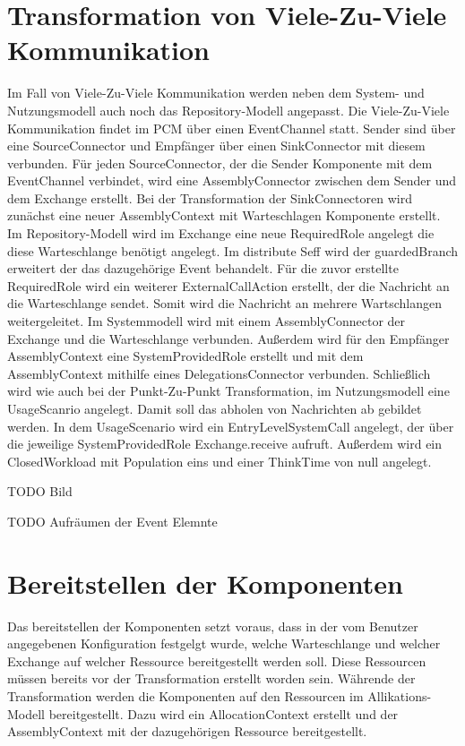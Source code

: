 \section{Transformation von Viele-Zu-Viele Kommunikation}
Im Fall von Viele-Zu-Viele Kommunikation werden neben dem System- und Nutzungsmodell auch noch das Repository-Modell angepasst. Die Viele-Zu-Viele Kommunikation findet im PCM über einen EventChannel statt. Sender sind über eine SourceConnector und Empfänger über einen SinkConnector mit diesem verbunden. Für jeden SourceConnector, der die Sender Komponente mit dem EventChannel verbindet, wird eine AssemblyConnector zwischen dem Sender und dem Exchange erstellt. Bei der Transformation der SinkConnectoren wird zunächst eine neuer AssemblyContext mit Warteschlagen Komponente erstellt. Im Repository-Modell wird im Exchange eine neue RequiredRole angelegt die diese Warteschlange benötigt angelegt. Im distribute Seff wird der guardedBranch erweitert der das dazugehörige Event behandelt. Für die zuvor erstellte RequiredRole wird ein weiterer ExternalCallAction erstellt, der die Nachricht an die Warteschlange sendet. Somit wird die Nachricht an mehrere Wartschlangen weitergeleitet. Im Systemmodell wird mit einem AssemblyConnector der Exchange und die Warteschlange verbunden. Außerdem wird für den Empfänger AssemblyContext eine SystemProvidedRole erstellt und mit dem AssemblyContext mithilfe eines DelegationsConnector verbunden. Schließlich wird wie auch bei der Punkt-Zu-Punkt Transformation, im Nutzungsmodell eine UsageScanrio angelegt. Damit soll das abholen von Nachrichten ab gebildet werden. In dem UsageScenario wird ein EntryLevelSystemCall angelegt, der über die jeweilige SystemProvidedRole Exchange.receive aufruft. Außerdem wird ein ClosedWorkload mit Population eins und einer ThinkTime von null angelegt.


TODO Bild

TODO Aufräumen der Event Elemnte

\section{Bereitstellen der Komponenten}
Das bereitstellen der Komponenten setzt voraus, dass in der vom Benutzer angegebenen Konfiguration festgelgt wurde, welche Warteschlange und welcher Exchange auf welcher Ressource bereitgestellt werden soll. Diese Ressourcen müssen bereits vor der Transformation erstellt worden sein. Währende der Transformation werden die Komponenten auf den Ressourcen im Allikations-Modell bereitgestellt. Dazu wird ein AllocationContext erstellt und der AssemblyContext mit der dazugehörigen Ressource bereitgestellt.

